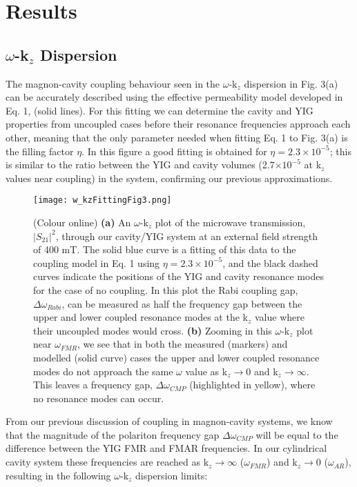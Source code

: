 \documentclass[prb,twocolumn,showpacs,preprintnumbers,amsmath,amssymb]{revtex4-1}
\begin{document}
\section{Results}

\subsection{$\omega$-k$_{z}$ Dispersion}


The magnon-cavity coupling behaviour seen in the $\omega$-k$_{z}$ dispersion in Fig. 3(a) can be accurately described using the effective permeability model developed in Eq. 1, (solid lines). For this fitting we can determine the cavity and YIG properties from uncoupled cases before their resonance frequencies approach each other, meaning that the only parameter needed when fitting Eq. 1 to Fig. 3(a) is the filling factor $\eta$. In this figure a good fitting is obtained for $\eta=2.3\times 10^{-5}$; this is similar to the ratio between the YIG and cavity volumes (2.7$\times 10^{-5}$ at k$_{z}$ values near coupling) in the system, confirming our previous approximations.


\begin{figure}[t]
\centering
\texttt{[image: w\_kzFittingFig3.png]}
\caption{(Colour online) \textbf{(a)} An $\omega$-k$_{z}$ plot of the microwave transmission, $|S_{21}|^{2}$, through our cavity/YIG system at an external field strength of 400 mT. The solid blue curve is a fitting of this data to the coupling model in Eq. 1 using $\eta=2.3\times 10^{-5}$, and the black dashed curves indicate the positions of the YIG and cavity resonance modes for the case of no coupling. In this plot the Rabi coupling gap, $\Delta\omega_{Rabi}$, can be measured as half the frequency gap between the upper and lower coupled resonance modes at the k$_{z}$ value where their uncoupled modes would cross. \textbf{(b)} Zooming in this $\omega$-k$_{z}$ plot near $\omega_{FMR}$, we see that in both the measured (markers) and modelled (solid curve) cases the upper and lower coupled resonance modes do not approach the same $\omega$ value as k$_{z}\rightarrow 0$ and k$_{z}\rightarrow\infty$. This leaves a frequency gap, $\Delta\omega_{CMP}$ (highlighted in yellow), where no resonance modes can occur.}
\label{Figure 3}
\end{figure}





From our previous discussion of coupling in magnon-cavity systems, we know that the magnitude of the polariton frequency gap $\Delta\omega_{CMP}$ will be equal to the difference between the YIG FMR and FMAR frequencies. In our cylindrical cavity system these frequencies are reached as k$_{z}\rightarrow\infty$ ($\omega_{FMR}$) and k$_{z}\rightarrow 0$ ($\omega_{AR}$), resulting in the following $\omega$-k$_{z}$ dispersion limits:
\end{document}
